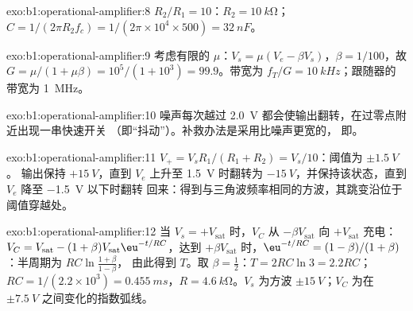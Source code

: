\begin{solution}{exo:b1:operational-amplifier:8}
$R_2/R_1 = 10$：$R_2 = \qty{10}{k\ohm}$；$C = 1/(2\pi R_2f_c) = 1/(2\pi
\times 10^4 \times 500) = \qty{32}{nF}$。
\end{solution}

\begin{solution}{exo:b1:operational-amplifier:9}
考虑有限的 $\mu$：$V_s = \mu(V_e - \beta V_s)$，$\beta = 1/100$，故
$G = \mu/(1 + \mu\beta) = 10^5/(1 + 10^3) = 99.9$。带宽为 $f_T/G =
\qty{10}{kHz}$；跟随器的带宽为 \qty{1}{MHz}。
\end{solution}

\begin{solution}{exo:b1:operational-amplifier:10}
噪声每次越过 \qty{2.0}{V} 都会使输出翻转，在过零点附近出现一串快速开关
（即“抖动”）。补救办法是采用比噪声更宽的，
即。
\end{solution}

\begin{solution}{exo:b1:operational-amplifier:11}
$V_+ = V_sR_1/(R_1 + R_2) = V_s/10$：阈值为 $\pm\qty{1.5}{V}$。
输出保持 $+\qty{15}{V}$，直到 $V_e$ 上升至 \qty{1.5}{V} 时翻转为
$-\qty{15}{V}$，并保持该状态，直到 $V_e$ 降至 \qty{-1.5}{V} 以下时翻转
回来：得到与三角波频率相同的方波，其跳变沿位于
阈值穿越处。
\end{solution}

\begin{solution}{exo:b1:operational-amplifier:12}
当 $V_s = +V_{\mathrm{sat}}$ 时，$V_C$ 从 $-\beta V_{\mathrm{sat}}$
向 $+V_{\mathrm{sat}}$ 充电：$V_C = V_{\mathrm{sat}} - (1 + \beta)V_{\mathrm{sat}}
\eu^{-t/RC}$，达到 $+\beta V_{\mathrm{sat}}$ 时，$\eu^{-t/RC} =
(1 - \beta)/(1 + \beta)$：半周期为 $RC\ln\frac{1 + \beta}{1 - \beta}$，
由此得到 $T$。取 $\beta = \tfrac12$：$T = 2RC\ln 3 = 2.2RC$；$RC = 1/(2.2 \times
10^3) = \qty{0.455}{ms}$，$R = \qty{4.6}{k\ohm}$。$V_s$ 为方波
$\pm\qty{15}{V}$；$V_C$ 为在 $\pm\qty{7.5}{V}$ 之间变化的指数弧线。
\end{solution}

